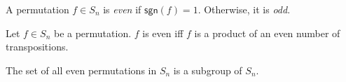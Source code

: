 \documentclass{article}
\begin{document}
\begin{definition}
  A permutation $f \in S_n$ is \emph{even} if $\mathsf{sgn}(f) = 1$. Otherwise, it is \emph{odd}.
\end{definition}

\begin{theorem}
  Let $f \in S_n$ be a permutation. $f$ is even iff $f$ is a product of an even number of transpositions.
\end{theorem}

\begin{proposition}
  The set of all even permutations in $S_n$ is a subgroup of $S_n$.
\end{proposition}
\end{document}
